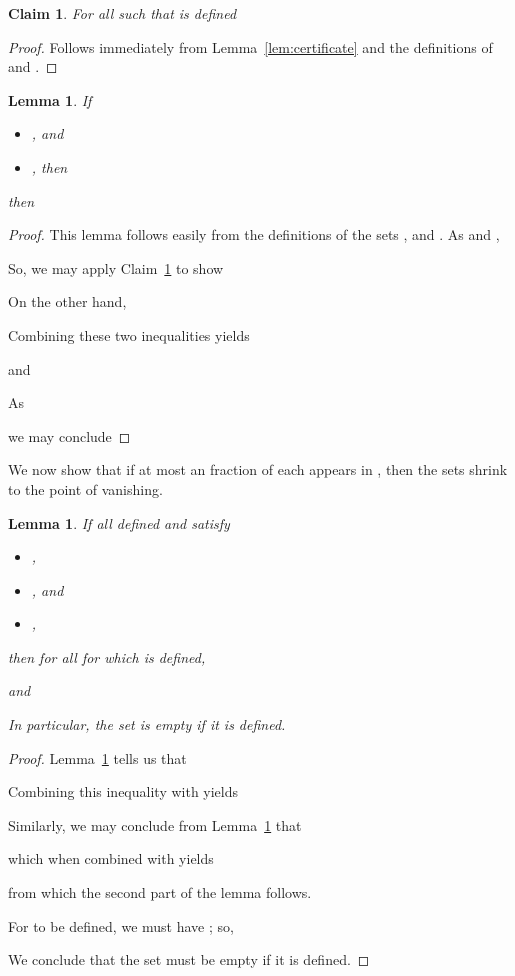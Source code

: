 \documentclass[11pt]{article}
\newtheorem{lemma}[theorem]{Lemma}
\newtheorem{claim}[theorem]{Claim}
\begin{document}
\begin{claim}\label{clm:uiExpander}
For all  such that  is defined

\end{claim}
\begin{proof}
Follows immediately from  Lemma~\ref{lem:certificate} and
  the definitions of  and .
\end{proof}


\begin{lemma}\label{lem:ac1}
If
\begin{itemize}
\item [(a)] , and
\item [(b)] , then
\end{itemize}
  then

\end{lemma}
\begin{proof}
This lemma follows easily from the definitions of the sets 
  ,  and .
As  and ,

So, we may apply Claim~\ref{clm:uiExpander} 
  to show

On the other hand, 

Combining these two inequalities yields

and

As

we may conclude

\end{proof}

We now show that if at most an  fraction of each  appears in
  , then the sets  shrink to the point of vanishing.

\begin{lemma}\label{lem:ac2}
If all defined  and  satisfy
\begin{itemize}
\item [(a)] , 
\item [(b)] , and
\item [(c)] ,
\end{itemize}
then
for all  for which  is defined,

and

In particular, the set  is empty if it is defined.
\end{lemma}
\begin{proof}
Lemma~\ref{lem:ac1} tells us that

Combining this inequality with  yields

Similarly, we may conclude from Lemma~\ref{lem:ac1} that

which when combined with  yields

from which the second part of the lemma follows.

For  to be defined, we must have ;
  so,

We conclude that the set  must be empty if it is defined.
\end{proof}
\end{document}

